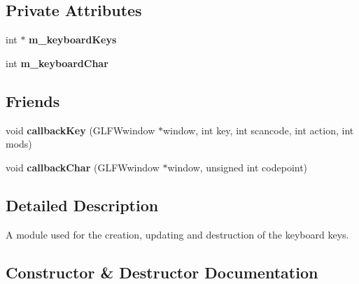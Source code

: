 \subsection*{Private Attributes}
\begin{DoxyCompactItemize}
\item 
\mbox{\label{classflounder_1_1keyboard_a001e792e18b8f7bf5814029e8684578b}} 
int $\ast$ {\bfseries m\+\_\+keyboard\+Keys}
\item 
\mbox{\label{classflounder_1_1keyboard_ad924b25ac04f2ff3ac3dfd73b262bc9b}} 
int {\bfseries m\+\_\+keyboard\+Char}
\end{DoxyCompactItemize}
\subsection*{Friends}
\begin{DoxyCompactItemize}
\item 
\mbox{\label{classflounder_1_1keyboard_a4fc7bca704eede3c7af007a9babe43cb}} 
void {\bfseries callback\+Key} (G\+L\+F\+Wwindow $\ast$window, int key, int scancode, int action, int mods)
\item 
\mbox{\label{classflounder_1_1keyboard_aa928e0a569bf298be38f2458799ea372}} 
void {\bfseries callback\+Char} (G\+L\+F\+Wwindow $\ast$window, unsigned int codepoint)
\end{DoxyCompactItemize}


\subsection{Detailed Description}
A module used for the creation, updating and destruction of the keyboard keys. 



\subsection{Constructor \& Destructor Documentation}
\mbox{\label{classflounder_1_1keyboard_a2545f195eb7f57530cdc9056f641702c}} 
